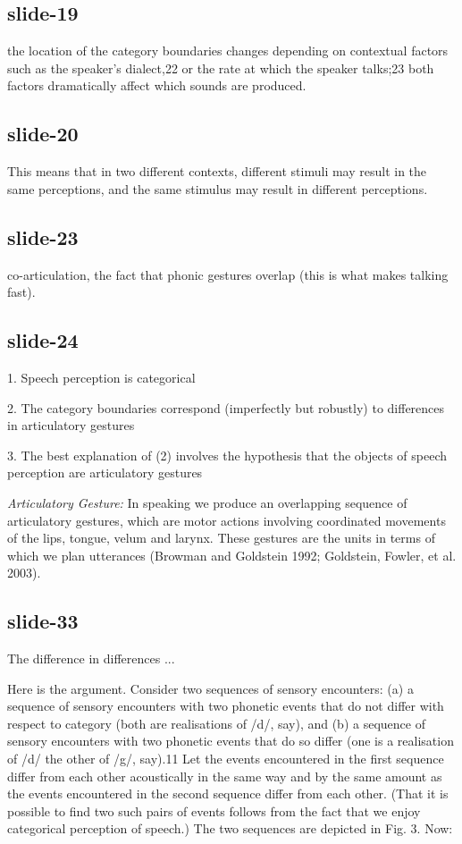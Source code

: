 \documentclass[12pt,\papersize]{extarticle}
\begin{document}
\subsection{slide-19}
the location of the category boundaries changes depending on contextual factors such as the
speaker’s dialect,22 or the rate at which the speaker talks;23 both factors dramatically affect
which sounds are produced.

\subsection{slide-20}
This means that in two different contexts, different stimuli may result in the same perceptions, and
the same stimulus may result in different perceptions.

\subsection{slide-23}
co-articulation, the fact that phonic gestures overlap (this is what makes talking fast).

\subsection{slide-24}
1. Speech perception is categorical



  2. The category boundaries correspond (imperfectly but robustly) to differences in articulatory gestures



  3.  The best explanation of (2) involves the hypothesis that the objects of speech perception are articulatory gestures


\emph{Articulatory Gesture:}
In speaking we produce an overlapping sequence of articulatory gestures, which are motor actions
involving coordinated movements of the lips, tongue, velum and larynx. These gestures are the units
in terms of which we plan utterances (Browman and Goldstein 1992; Goldstein, Fowler, et al. 2003).

\subsection{slide-33}
The difference in differences ...

Here is the argument. Consider two sequences of sensory encounters: (a) a sequence of sensory
encounters with two phonetic events that do not differ with respect to category (both are
realisations of /d/, say), and (b) a sequence of sensory encounters with two phonetic events that do
so differ (one is a realisation of /d/ the other of /g/, say).11 Let the events encountered in the
first sequence differ from each other acoustically in the same way and by the same amount as the
events encountered in the second sequence differ from each other. (That it is possible to find two
such pairs of events follows from the fact that we enjoy categorical perception of speech.) The two
sequences are depicted in Fig. 3. Now:
\end{document}
